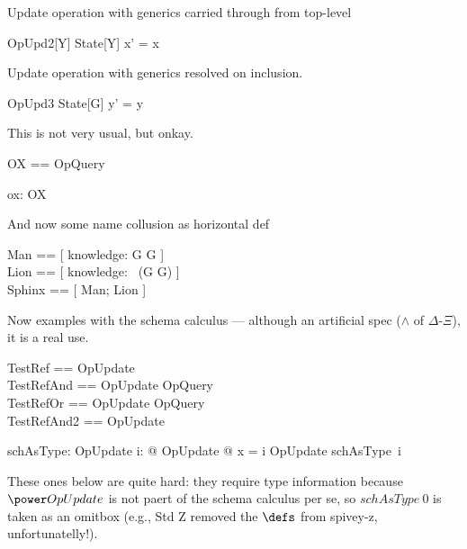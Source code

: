 \documentclass{article}
\begin{document}
Update operation with generics carried through from top-level
\begin{schema}{OpUpd2}[Y]
   \Delta State[Y]
\where
    x' = x 
\end{schema}

Update operation with generics resolved on inclusion.
\begin{schema}{OpUpd3}
   \Delta State[G]
\where
    y' = y 
\end{schema}

This is not very usual, but onkay.
\begin{zed}
   OX == \pre OpQuery
\end{zed}

\begin{axdef}
   ox: OX
\end{axdef}

And now some name collusion as horizontal def
\begin{zed} 
   Man  == [ knowledge: G \fun G ] \\
   Lion == [ knowledge: \power~(G \cross G) ] \\
   Sphinx == [ Man; Lion ]
\end{zed}

Now examples with the schema calculus --- although an artificial spec ($\land$ of $\Delta$-$\Xi$), it is a real use.
\begin{zed}
   TestRef     == OpUpdate \\
   TestRefAnd  == OpUpdate \land OpQuery \\
   TestRefOr   == OpUpdate \lor OpQuery \\
   TestRefAnd2 == OpUpdate \land [ v: \nat ]
\end{zed}

\begin{axdef}
   schAsType: \nat \fun \power OpUpdate
\where
   \forall i: \nat @ \exists OpUpdate @ x = i \land \theta OpUpdate \in schAsType~i 
\end{axdef}

These ones below are quite hard: they require type information because $\power OpUpdate$ 
is not paert of the schema calculus per se, so $schAsType~0$ is taken as an omitbox
(e.g., Std Z removed the $\defs$ from spivey-z, unfortunatelly!).
%
\end{document}
